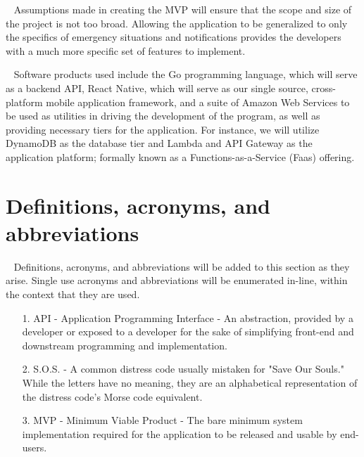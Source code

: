 \documentclass{scrreprt}
\begin{document}
\par ~ Assumptions made in creating the MVP will ensure that the scope and size of the project is not too broad. Allowing the application to be generalized to only the specifics of emergency situations and notifications provides the developers with a much more specific set of features to implement.

\par ~ Software products used include the Go programming language, which will serve as a backend API, React Native, which will serve as our single source, cross-platform mobile application framework, and a suite of Amazon Web Services to be used as utilities in driving the development of the program, as well as providing necessary tiers for the application. For instance, we will utilize DynamoDB as the database tier and Lambda and API Gateway as the application platform; formally known as a Functions-as-a-Service (Faas) offering.


\section{Definitions, acronyms, and abbreviations}
\par ~ Definitions, acronyms, and abbreviations will be added to this section as they arise. Single use acronyms and abbreviations will be enumerated in-line, within the context that they are used.
\begin{enumerate}
	\item[1.] API - Application Programming Interface - An abstraction, provided by a developer or exposed to a developer for the sake of simplifying front-end and downstream programming and implementation.
	\item[2.] S.O.S. - A common distress code usually mistaken for "Save Our Souls." While the letters have no meaning, they are an alphabetical representation of the distress code's Morse code equivalent.
	\item[3.] MVP - Minimum Viable Product - The bare minimum system implementation required for the application to be released and usable by end-users.
\end{enumerate}
\end{document}
